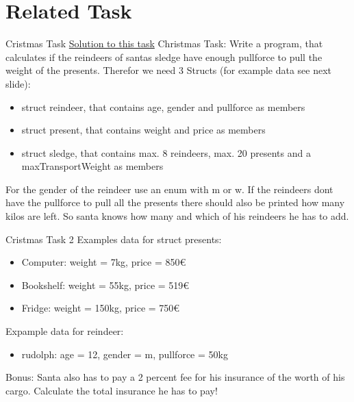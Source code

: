 \section{Related Task}
\begin{frame}{Cristmas Task}
    \href{https://github.com/scholzp/c-lessons/tree/master/solutions/Santas_sledge}{Solution to this task}
    \newline
    Christmas Task:
    Write a program, that calculates if the reindeers of santas sledge have enough pullforce to pull the weight of the presents.
    Therefor we need 3 Structs (for example data see next slide):
    \begin{itemize}
     \item struct reindeer, that contains age, gender and pullforce as members
     \item struct present, that contains weight and price as members
     \item struct sledge, that contains max. 8 reindeers, max. 20 presents and a maxTransportWeight as members
    \end{itemize}
    For the gender of the reindeer use an enum with m or w.\newline\newline
    If the reindeers dont have the pullforce to pull all the presents there should also be printed how many kilos are left. So santa knows how many and which of his reindeers he has to add.

\end{frame}

\begin{frame}{Cristmas Task 2}
    Examples data for struct presents:
    \begin{itemize}
     \item Computer: weight = 7kg, price = 850€
     \item Bookshelf: weight = 55kg, price = 519€
     \item Fridge: weight = 150kg, price = 750€
    \end{itemize}
    Expample data for reindeer:
    \begin{itemize}
     \item rudolph: age = 12, gender = m, pullforce = 50kg
    \end{itemize}
    Bonus: Santa also has to pay a 2 percent fee for his insurance of the worth of his cargo. Calculate the total insurance he has to pay!
\end{frame}


